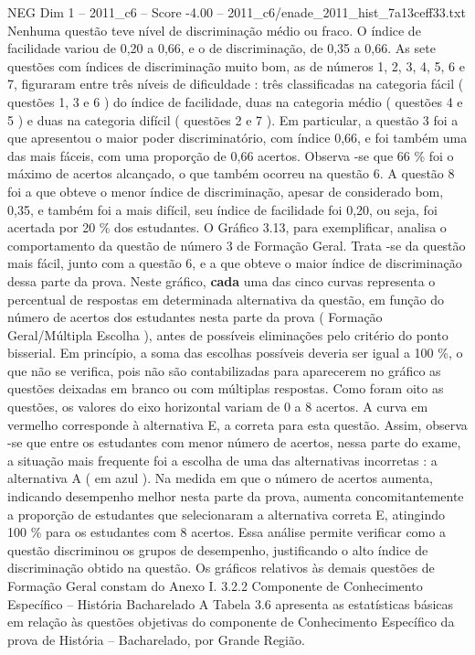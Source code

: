 \begin{textsample}{NEG Dim 1 – 2011\_c6 – Score -4.00 – 2011\_c6/enade\_2011\_hist\_7a13ceff33.txt}
Nenhuma questão teve nível de discriminação médio ou fraco.
O índice de facilidade variou de 0,20 a 0,66, e o de discriminação, de 0,35 a 0,66.
As sete questões com índices de discriminação muito bom, as de números 1, 2, 3, 4, 5, 6 e 7, figuraram entre três níveis de dificuldade : três classificadas na categoria fácil ( questões 1, 3 e 6 ) do índice de facilidade, duas na categoria médio ( questões 4 e 5 ) e duas na categoria difícil ( questões 2 e 7 ).
Em particular, a questão 3 foi a que apresentou o maior poder discriminatório, com índice 0,66, e foi também uma das mais fáceis, com uma proporção de 0,66 acertos.
Observa -se que 66 \% foi o máximo de acertos alcançado, o que também ocorreu na questão 6.
A questão 8 foi a que obteve o menor índice de discriminação, apesar de considerado bom, 0,35, e também foi a mais difícil, seu índice de facilidade foi 0,20, ou seja, foi acertada por 20 \% dos estudantes.
O Gráfico 3.13, para exemplificar, analisa o comportamento da questão de número 3 de Formação Geral.
Trata -se da questão mais fácil, junto com a questão 6, e a que obteve o maior índice de discriminação dessa parte da prova.
Neste gráfico, \textbf{cada} uma das cinco curvas representa o percentual de respostas em determinada alternativa da questão, em função do número de acertos dos estudantes nesta parte da prova ( Formação Geral/Múltipla Escolha ), antes de possíveis eliminações pelo critério do ponto bisserial.
Em princípio, a soma das escolhas possíveis deveria ser igual a 100 \%, o que não se verifica, pois não são contabilizadas para aparecerem no gráfico as questões deixadas em branco ou com múltiplas respostas.
Como foram oito as questões, os valores do eixo horizontal variam de 0 a 8 acertos.
A curva em vermelho corresponde à alternativa E, a correta para esta questão.
Assim, observa -se que entre os estudantes com menor número de acertos, nessa parte do exame, a situação mais frequente foi a escolha de uma das alternativas incorretas : a alternativa A ( em azul ).
Na medida em que o número de acertos aumenta, indicando desempenho melhor nesta parte da prova, aumenta concomitantemente a proporção de estudantes que selecionaram a alternativa correta E, atingindo 100 \% para os estudantes com 8 acertos.
Essa análise permite verificar como a questão discriminou os grupos de desempenho, justificando o alto índice de discriminação obtido na questão.
Os gráficos relativos às demais questões de Formação Geral constam do Anexo I. 3.2.2 Componente de Conhecimento Específico – História Bacharelado A Tabela 3.6 apresenta as estatísticas básicas em relação às questões objetivas do componente de Conhecimento Específico da prova de História – Bacharelado, por Grande Região.

\end{textsample}
